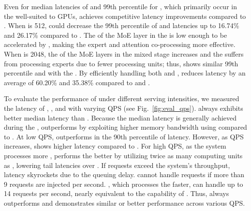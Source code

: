 Even for median latencies of \ttft and 99th percentile for \tbt, which primarily occur in the \mixedstage well-suited to GPUs, \duplexpet achieves competitive latency improvements compared to \doublegpu.
When \lin is 512, \duplexpet could decrease the 99th percentile of \tbt and \ttft latencies up to 16.74\% and 26.17\% compared to \doublegpu. The \opb of the MoE layer in the \mixedstage is low enough to be accelerated by \lowp, making the expert and attention co-processing more effective.
When \lin is 2048, the \opb of the MoE layers in the mixed stage increases and the \lowp suffers from processing experts due to fewer processing units; thus, \duplexpet shows similar 99th percentile \tbt and \ttft with the \doublegpu.
By efficiently handling both \deconlystage and \mixedstage, \duplexpet reduces \ete latency by an average of 60.20\% and 35.38\% compared to \gpu and \doublegpu. 


To evaluate the performance of \duplex under different serving intensities, we measured the latency of \duplex, \gpu, and \doublegpu with varying QPS (see Fig.~\ref{fig:eval_qps}).
\duplex always exhibits better median \tbt latency than \doublegpu.
Because the median \tbt latency is generally achieved during the \deconlystage, \duplex outperforms \doublegpu by exploiting higher memory bandwidth using \lowp compared to \doublegpu.
At low QPS, \duplex outperforms \doublegpu in the 90th percentile of \tbt latency.
However, as QPS increases, \duplex shows higher latency compared to \doublegpu.
For high QPS, as the system processes more , \doublegpu performs the \mixedstage better by utilizing twice as many computing units as \duplex, lowering tail \tbt latencies over \duplex.
If requests exceed the system's throughput, \ttft latency skyrockets due to the queuing delay.
\gpu cannot handle requests if more than 9 requests are injected per second.
\duplex, which processes the \deconlystage faster, can handle up to 14 requests per second, nearly equivalent to the capability of \doublegpu.
Thus, \duplex always outperforms \gpu and demonstrates similar or better performance across various QPS.


